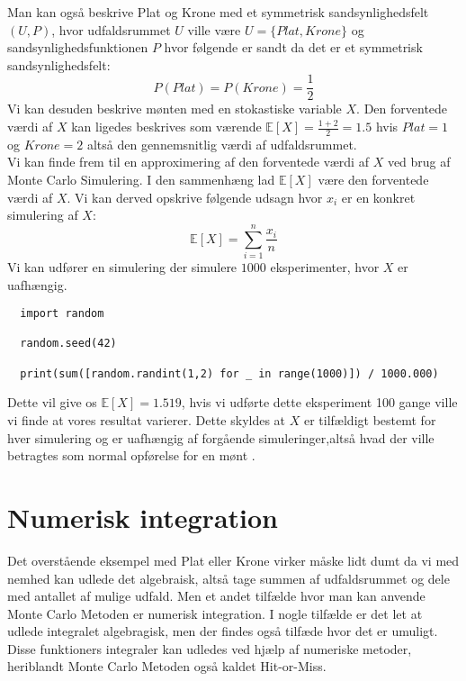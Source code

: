 \documentclass[../../SRP.tex]{subfiles}
\begin{document}
Man kan også beskrive Plat og Krone med et symmetrisk sandsynlighedsfelt $(U, P)$, hvor udfaldsrummet $U$ ville være $U = \{Plat, Krone\}$ og sandsynlighedsfunktionen $P$ hvor følgende er sandt da det er et symmetrisk sandsynlighedsfelt:
\begin{equation}
  P(Plat) = P(Krone) = \frac{1}{2}
\end{equation}
Vi kan desuden beskrive mønten med en stokastiske variable $X$. Den forventede værdi af $X$ kan ligedes beskrives som værende $\mathbb{E}[X] = \frac{1 + 2}{2} = 1.5$ hvis $Plat = 1$ og $Krone = 2$ altså den gennemsnitlig værdi af udfaldsrummet. \\

Vi kan finde frem til en approximering af den forventede værdi af $X$ ved brug af Monte Carlo Simulering. I den sammenhæng lad $\mathbb{E}[X]$ være den forventede værdi af $X$. Vi kan derved opskrive følgende udsagn hvor $x_i$ er en konkret simulering af $X$:
\begin{equation}
  \mathbb{E}[X] = \sum\limits_{i=1}^n\frac{x_i}{n}
\end{equation}
Vi kan udfører en simulering der simulere $1000$ eksperimenter, hvor $X$ er uafhængig.
\begin{lstlisting}
  import random

  random.seed(42)

  print(sum([random.randint(1,2) for _ in range(1000)]) / 1000.000)
\end{lstlisting}
Dette vil give os $\mathbb{E}[X] = 1.519$, hvis vi udførte dette eksperiment 100 gange ville vi finde at vores resultat varierer. Dette skyldes at $X$ er tilfældigt bestemt for hver simulering og er uafhængig af forgående simuleringer,altså hvad der ville betragtes som normal opførelse for en mønt \cite{NM}. \\

\section{Numerisk integration}

Det overstående eksempel med Plat eller Krone virker måske lidt dumt da vi med nemhed kan udlede det algebraisk, altså tage summen af udfaldsrummet og dele med antallet af mulige udfald. Men et andet tilfælde hvor man kan anvende Monte Carlo Metoden er numerisk integration. I nogle tilfælde er det let at udlede integralet algebragisk, men der findes også tilfæde hvor det er umuligt. Disse funktioners integraler kan udledes ved hjælp af numeriske metoder, heriblandt Monte Carlo Metoden også kaldet Hit-or-Miss. \cite{SBM} \\
\end{document}
